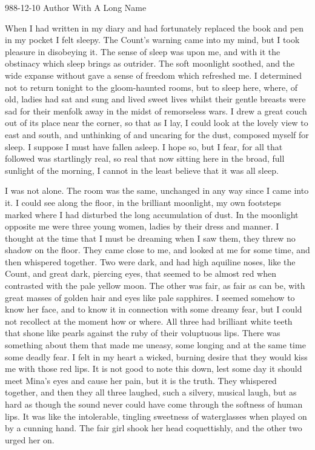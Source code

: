 \documentclass[10pt,a4paper]{article}
\begin{document}
\titleTesting
\date1988-12-10
\authorCool Author With A Long Name
\maketitle
    
\thispagestyle{plain}
\setcounter{page}{1}
\linenumbers
When I had written in my diary and had fortunately replaced the book and pen in my pocket I felt sleepy. The Count's warning came into my mind, but I took pleasure in disobeying it. The sense of sleep was upon me, and with it the obstinacy which sleep brings as outrider. The soft moonlight soothed, and the wide expanse without gave a sense of freedom which refreshed me. I determined not to return tonight to the gloom-haunted rooms, but to sleep here, where, of old, ladies had sat and sung and lived sweet lives whilst their gentle breasts were sad for their menfolk away in the midst of remorseless wars. I drew a great couch out of its place near the corner, so that as I lay, I could look at the lovely view to east and south, and unthinking of and uncaring for the dust, composed myself for sleep. I suppose I must have fallen asleep. I hope so, but I fear, for all that followed was startlingly real, so real that now sitting here in the broad, full sunlight of the morning, I cannot in the least believe that it was all sleep.

I was not alone. The room was the same, unchanged in any way since I came into it. I could see along the floor, in the brilliant moonlight, my own footsteps marked where I had disturbed the long accumulation of dust. In the moonlight opposite me were three young women, ladies by their dress and manner. I thought at the time that I must be dreaming when I saw them, they threw no shadow on the floor. They came close to me, and looked at me for some time, and then whispered together. Two were dark, and had high aquiline noses, like the Count, and great dark, piercing eyes, that seemed to be almost red when contrasted with the pale yellow moon. The other was fair, as fair as can be, with great masses of golden hair and eyes like pale sapphires. I seemed somehow to know her face, and to know it in connection with some dreamy fear, but I could not recollect at the moment how or where. All three had brilliant white teeth that shone like pearls against the ruby of their voluptuous lips. There was something about them that made me uneasy, some longing and at the same time some deadly fear. I felt in my heart a wicked, burning desire that they would kiss me with those red lips. It is not good to note this down, lest some day it should meet Mina's eyes and cause her pain, but it is the truth. They whispered together, and then they all three laughed, such a silvery, musical laugh, but as hard as though the sound never could have come through the softness of human lips. It was like the intolerable, tingling sweetness of waterglasses when played on by a cunning hand. The fair girl shook her head coquettishly, and the other two urged her on.
\end{document}
